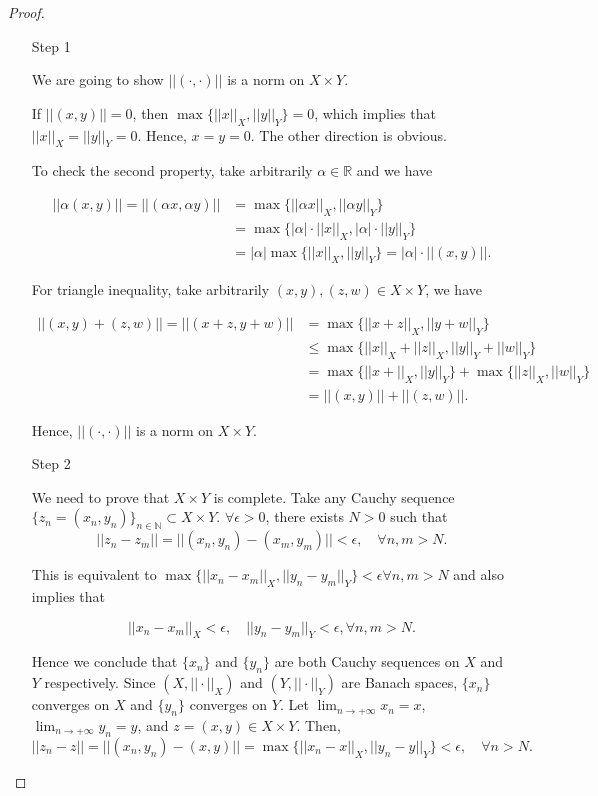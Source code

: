 \documentclass[12pt]{article}
\begin{document}
\begin{proof}
\ 

\begin{enumerate}
\item [Step 1]

We are going to show $||(\cdot, \cdot)||$ is a norm on $X\times Y$. 

If $||(x, y)|| = 0$, then $\max \{ ||x||_X, ||y||_Y \} = 0$, which implies that $||x||_X = ||y||_Y = 0$. Hence, $x = y = 0$. The other direction is obvious. 

To check the second property, take arbitrarily $\alpha \in \mathbb R$ and we have 

$$
\begin{aligned}
||\alpha (x, y)|| = ||(\alpha x, \alpha y)|| & = \max \{ ||\alpha x||_X, ||\alpha y||_Y \}\\
& = \max \{ |\alpha | \cdot ||x||_X, |\alpha | \cdot ||y||_Y \}\\ & = |\alpha|\max \{ ||x||_X, ||y||_Y \} = |\alpha| \cdot ||(x, y)||.
\end{aligned}
$$

For triangle inequality, take arbitrarily $(x, y), (z, w) \in X\times Y$, we have 

$$
\begin{aligned}
||(x, y) + (z, w)|| = ||(x+z, y+w)|| & = \max\{ ||x+z||_X, ||y+w||_Y \} \\
& \leqslant \max\{ ||x||_X + ||z||_X, ||y||_Y + ||w||_Y \} \\
& = \max\{ ||x+||_X, ||y||_Y \} + \max\{ ||z||_X, ||w||_Y \} \\
& = ||(x, y)|| + ||(z, w)||.
\end{aligned}
$$

Hence, $||(\cdot, \cdot)||$ is a norm on $X\times Y$. 

\item [Step 2]

We need to prove that $X\times Y$ is complete. Take any Cauchy sequence $\{z_n = (x_n, y_n)\}_{n\in\mathbb N} \subset X\times Y$. $\forall \epsilon >0$, there exists $N > 0$ such that 
$$ 
||z_n - z_m|| = ||(x_n, y_n) - (x_m, y_m)|| < \epsilon, \quad \forall n, m > N.
$$

This is equivalent to $\max\{||x_n - x_m||_X, ||y_n - y_m||_Y\} < \epsilon \forall n, m > N$ and also implies that 

$$
||x_n - x_m||_X < \epsilon, \quad ||y_n - y_m||_Y < \epsilon, 
\forall n, m > N.
$$

Hence we conclude that $\{x_n\}$ and $\{y_n\}$ are both Cauchy sequences on $X$ and $Y$ respectively. Since $(X, ||\cdot||_X)$ and $(Y, ||\cdot||_Y)$ are Banach spaces, $\{x_n\}$ converges on $X$ and $\{y_n\}$ converges on $Y$. Let $\lim_{n\rightarrow +\infty} x_n = x$, $\lim_{n\rightarrow +\infty} y_n = y$, and $z = (x, y)\in X\times Y$. Then,
$$ 
||z_n - z|| = ||(x_n, y_n) - (x, y)|| = \max\{||x_n - x||_X, ||y_n - y||_Y\}< \epsilon, \quad \forall n > N.
$$


\end{enumerate}
\end{proof}
\end{document}
